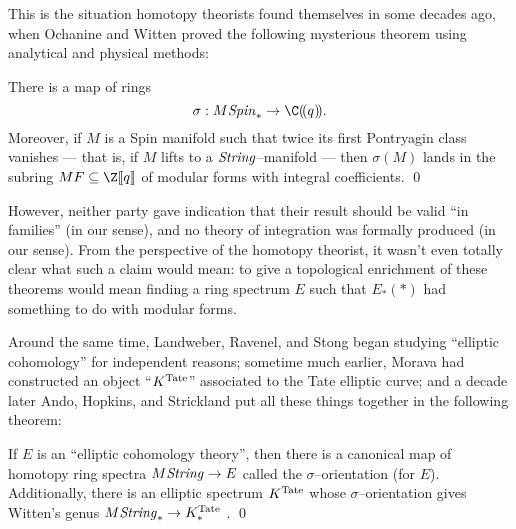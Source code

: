 This is the situation homotopy theorists found themselves in some decades ago, when Ochanine and Witten proved the following mysterious theorem using analytical and physical methods:

\begin{theorem}\label{OchanineWittenTheorem}
There is a map of rings \[\sigma: M\Spin_* \to \C(\!(q)\!).\]  Moreover, if $M$ is a Spin manifold such that twice its first Pontryagin class vanishes --- that is, if $M$ lifts to a $\mathit{String}$--manifold --- then $\sigma(M)$ lands in the subring $MF \subseteq \Z\ps{q}$ of modular forms with integral coefficients. \qed
\end{theorem}

\noindent However, neither party gave indication that their result should be valid ``in families'' (in our sense), and no theory of integration was formally produced (in our sense).  From the perspective of the homotopy theorist, it wasn't even totally clear what such a claim would mean: to give a topological enrichment of these theorems would mean finding a ring spectrum $E$ such that $E_*(*)$ had something to do with modular forms.

Around the same time, Landweber, Ravenel, and Stong began studying ``elliptic cohomology'' for independent reasons; sometime much earlier, Morava had constructed an object ``$K^{\mathrm{Tate}}$'' associated to the Tate elliptic curve; and a decade later Ando, Hopkins, and Strickland put all these things together in the following theorem:

\begin{theorem}
If $E$ is an ``elliptic cohomology theory'', then there is a canonical map of homotopy ring spectra $M\mathit{String} \to E$ called the $\sigma$--orientation (for $E$).  Additionally, there is an elliptic spectrum $K^{\mathrm{Tate}}$ whose $\sigma$--orientation gives Witten's genus $M\mathit{String}_* \to K^{\mathrm{Tate}}_*$ . \qed
\end{theorem}

